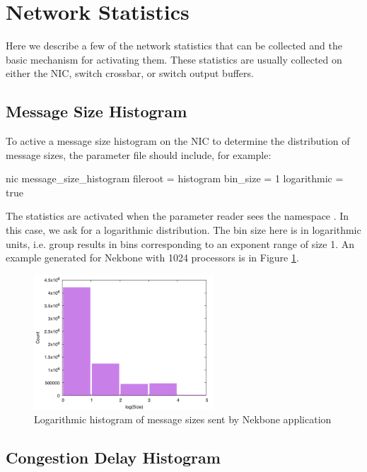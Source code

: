 

\section{Network Statistics}
\label{sec:tutorials:packetStats}

Here we describe a few of the network statistics that can be collected and the basic mechanism for activating them.
These statistics are usually collected on either the NIC, switch crossbar, or switch output buffers.

\subsection{Message Size Histogram}
\label{subsec:messageSizeHistogram}
To active a message size histogram on the NIC to determine the distribution of message sizes, the parameter file should include, for example:

\begin{ViFile}
nic {
 message_size_histogram {
   fileroot = histogram
   bin_size = 1
   logarithmic = true
 }
}
\end{ViFile}
The statistics are activated when the parameter reader sees the namespace .
In this case, we ask for a logarithmic distribution.
The bin size here is in logarithmic units, i.e. group results in bins corresponding to an exponent range of size 1.
An example generated for Nekbone with 1024 processors is in Figure \ref{fig:nekboneSizeHistogram}.

\begin{figure}
\centering
\includegraphics[width=0.6\textwidth]{figures/messageSizeHistogramNekbone}
\caption{Logarithmic histogram of message sizes sent by Nekbone application}
\label{fig:nekboneSizeHistogram}
\end{figure}

\subsection{Congestion Delay Histogram}
\label{subsec:congestionDelayHistogram}

